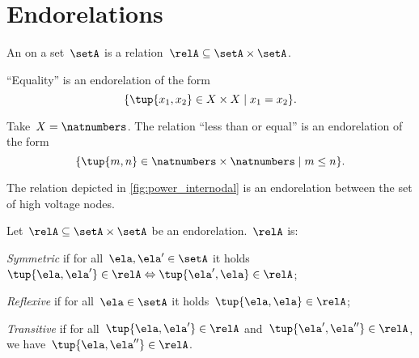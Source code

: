 

\section{Endorelations}
\label{sec:endorelations}



\begin{definition}[Endorelation]
  \label{def:endorelation}
  An \emph{} on a set~$\setA$ is a relation~$\relA\subseteq \setA\times \setA$.
\end{definition}

\begin{example}
  ``Equality'' is an endorelation of the form
  \begin{equation*}
    \{\tup{x_1,x_2}\in X\times X\mid x_1=x_2\}.
  \end{equation*}
\end{example}

\begin{example}
  Take~$X=\natnumbers$. The relation ``less than or equal'' is an endorelation of the form
  \begin{equation*}
    \{\tup{m,n}\in \natnumbers\times \natnumbers\mid m\leq n\}.
  \end{equation*}
\end{example}

\begin{example}
  The relation depicted in \cref{fig:power_internodal} is an endorelation between the set of high voltage nodes.
\end{example}

\begin{definition}
  \label{def:properties-endorelations}
  Let~$\relA\subseteq \setA\times \setA$ be an endorelation.~$\relA$ is:
  \begin{compactitem}
    \item \emph{Symmetric} if for all~$\ela, \ela'\in \setA$ it holds~$ \tup{\ela,\ela'}\in \relA \Leftrightarrow \tup{\ela',\ela}\in \relA$;
    \item \emph{Reflexive} if for all~$\ela\in \setA$ it holds~$\tup{\ela,\ela}\in \relA$;
    \item \emph{Transitive} if for all~$\tup{\ela,\ela'}\in \relA$ and~$\tup{\ela',\ela''}\in \relA$, we have~$\tup{\ela, \ela''}\in \relA$.
  \end{compactitem}
\end{definition}

